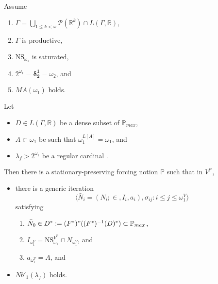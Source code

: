 \documentclass[12pt]{article}
\numberwithin{equation}{section}
\begin{document}
\begin{thm}\label{notion2}
Assume
\begin{enumerate}[label=(\roman*), leftmargin=40pt]
    \item\label{h1} $\Gamma  = \bigcup_{1 \leq k < \omega} \mathcal{P}(\mathbb{R}^{k}) \cap L(\Gamma, \mathbb{R})$,
    \item\label{h2} $\Gamma$ is productive,
    \item\label{h3} $\mathrm{NS}_{\omega_1}$ is saturated,
    \item\label{h4} $2^{\omega_1} = \mathbf{\delta^1_2} = \omega_2$, and
    \item\label{h5} $MA(\omega_1)$ holds.
\end{enumerate}
Let 
\begin{itemize}
    \item $D \in L(\Gamma, \mathbb{R})$ be a dense subset of $\mathbb{P}_{max}$,
    \item $A \subset \omega_1$ be such that $\omega_1^{L[A]} = \omega_1$, and
    \item $\lambda_f > 2^{\omega_1}$ be a regular cardinal .
\end{itemize}
Then there is a stationary-preserving forcing notion $\mathbb{P}$ such that in $V^{\mathbb{P}}$,
\begin{itemize}
    \item there is a generic iteration $$\langle \bar{N}_i = (N_i; \in, I_i, a_i), \sigma_{ij} : i \leq j \leq \omega_1^V \rangle$$ satisfying 
    \begin{enumerate}[label=(\arabic*), leftmargin=40pt]
        \item\label{nov1} $\bar{N}_0 \in D^* := (F^*) " ((F^*)^{-1}(D)^*) \subset \mathbb{P}_{max}$,
        \item\label{nov2} $I_{\omega_1^V} = \mathrm{NS}_{\omega_1}^{V^{\mathbb{P}}} \cap N_{\omega_1^V}$, and
        \item\label{nov3} $a_{\omega_1^V} = A$, and
    \end{enumerate}
    \item $Nb'_1(\lambda_f)$ holds.
\end{itemize}
\end{thm}
\end{document}
